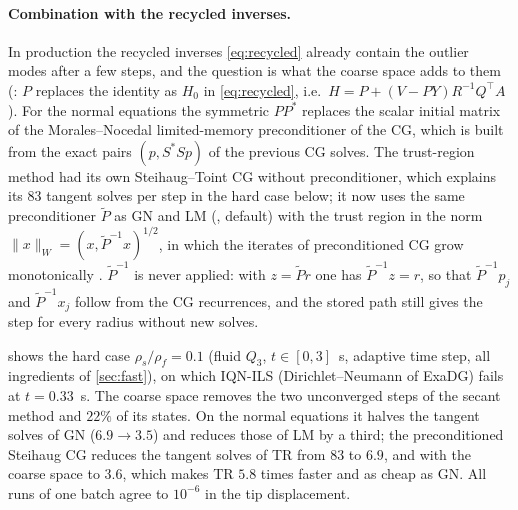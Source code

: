 \documentclass[11pt,a4paper]{article}
\theoremstyle{definition}
\theoremstyle{remark}
\begin{document}
\paragraph{Combination with the recycled inverses.} In production the recycled inverses
\eqref{eq:recycled} already contain the outlier modes after a few steps, and the question is what
the coarse space adds to them (: $P$ replaces the identity as
$H_0$ in \eqref{eq:recycled}, i.e.\ $H=P+(V-PY)R^{-1}Q^{\top}A$). For the normal equations the
symmetric $PP^*$ replaces the scalar initial matrix of the Morales--Nocedal limited-memory
preconditioner \cite{MoralesNocedal2000} of the CG, which is built from the exact pairs
$(p,S^*Sp)$ of the previous CG solves. The trust-region method had its own Steihaug--Toint CG
without preconditioner, which explains its $83$ tangent solves per step in the
hard case below; it now uses the same preconditioner $\tilde P$ as GN and LM
(, default) with the trust region in the norm
$\|x\|_W=(x,\tilde P^{-1}x)^{1/2}$, in which the iterates of preconditioned CG grow monotonically
\cite{Steihaug1983}. $\tilde P^{-1}$ is never applied: with $z=\tilde Pr$ one has
$\tilde P^{-1}z=r$, so that $\tilde P^{-1}p_j$ and $\tilde P^{-1}x_j$ follow from the CG
recurrences, and the stored path still gives the step for every radius without new solves.

 shows the hard case $\rho_s/\rho_f=0.1$ (fluid $Q_3$, $t\in[0,3]$~s, adaptive
time step, all ingredients of \cref{sec:fast}), on which IQN-ILS (Dirichlet--Neumann of ExaDG) fails at $t=0.33$~s. The coarse
space removes the two unconverged steps of the secant method and $22\%$ of its states. On the
normal equations it halves the tangent solves of GN ($6.9\to3.5$) and reduces those of LM by a
third; the preconditioned Steihaug CG reduces the tangent solves of TR from $83$ to $6.9$, and
with the coarse space to $3.6$, which makes TR $5.8$ times faster and as cheap as GN. All runs
of one batch agree to $10^{-6}$ in the tip displacement.
\end{document}
